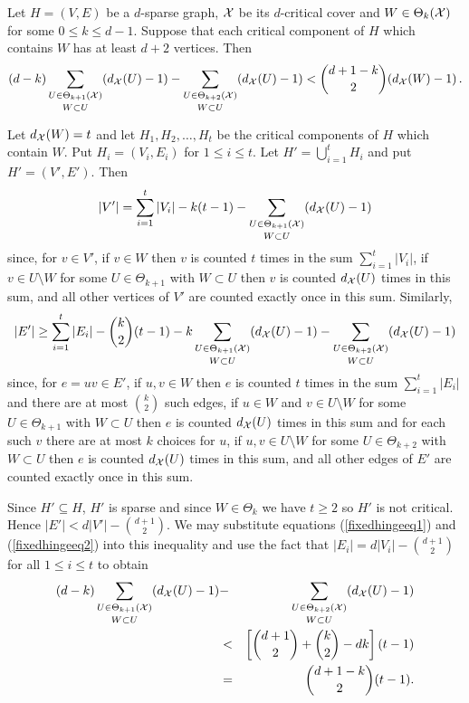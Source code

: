 \documentclass[11pt]{article}
\begin{document}
\begin{lemma}\label{prefixedhinge}
Let $H=(V,E)$ be a $d$-sparse graph, $\cal X$ be its $d$-critical
cover and $W\in \Theta_k({\cal X})$ for some $0\leq k\leq d-1$. Suppose
that each critical component of $H$ which contains $W$ has at least
$d+2$ vertices. Then
$$
(d-k)\sum_{\substack{U\in\Theta_{k+1}({\cal X})\\[0.7mm]W\subset U}}(d_{\cal X}(U)-1)-
\sum_{\substack{U\in\Theta_{k+2}({\cal X})\\[0.7mm]W\subset U}}(d_{\cal X}(U)-1)<{{d+1-k}\choose{2}}(d_{\cal X}(W)-1)
\,.$$
\end{lemma}
\bproof Let $d_{\cal X}(W)=t$ and let $H_1,H_2,\ldots,H_t$ be the
critical components of $H$ which contain $W$. Put $H_i=(V_i,E_i)$
for $1\leq i\leq t$. Let $H'=\bigcup_{i=1}^tH_i$ and put
$H'=(V',E')$. Then
\begin{equation}\label{fixedhingeeq1}
 |V'|=\sum_{i=1}^t|V_i|-k(t-1)-\sum_{\substack{U\in\Theta_{k+1}(\calx)\\[0.7mm]W\subset
 U}}(d_\calx(U)-1)
\end{equation}
since, for $v\in V'$, if $v\in W$ then $v$ is counted $t$ times in
the sum $\sum_{i=1}^t|V_i|$, if $v\in U\setminus W$ for some
$U\in\Theta_{k+1}$ with $W\subset U$ then $v$ is counted
$d_{\cal X}(U)$ times in this sum, and all other vertices of $V'$ are
counted exactly once in this sum. Similarly,
\begin{equation}\label{fixedhingeeq2}
 |E'|\geq\sum_{i=1}^t|E_i|-{{k}\choose{2}}(t-1)-k\sum_{\substack{U\in\Theta_{k+1}(\calx)\\[0.7mm]W\subset
 U}}(d_\calx(U)-1)-\sum_{\substack{U\in\Theta_{k+2}(\calx)\\[0.7mm]W\subset
 U}}(d_\calx(U)-1)
\end{equation}
since, for $e=uv\in E'$, if $u,v\in W$ then $e$ is counted $t$ times
in the sum $\sum_{i=1}^t|E_i|$ and there are at most
${{k}\choose{2}}$ such edges, if $u\in W$ and $v\in U\setminus W$
for some $U\in\Theta_{k+1}$ with $W\subset U$ then $e$ is counted
$d_{\cal X}(U)$ times in this sum and for each such $v$ there are at
most $k$ choices for $u$, if $u,v\in U\setminus W$ for some
$U\in\Theta_{k+2}$ with $W\subset U$ then $e$ is counted
$d_{\cal X}(U)$ times in this sum, and all other edges of $E'$ are
counted exactly once in this sum.

Since $H'\subseteq H$, $H'$ is sparse and since $W\in \Theta_k$ we
have $t\geq 2$ so $H'$ is not critical. Hence $|E'|<
d|V'|-{{d+1}\choose{2}}$. We may substitute equations
(\ref{fixedhingeeq1}) and (\ref{fixedhingeeq2}) into this inequality
and use the fact that $|E_i|=d|V_i|-{{d+1}\choose{2}}$ for all
$1\leq i\leq t$ to obtain
\begin{eqnarray*}
(d-k)\sum_{\substack{U\in\Theta_{k+1}({\cal X})\\[0.7mm]W\subset
U}}(d_{\cal X}(U)-1)&-&
\sum_{\substack{U\in\Theta_{k+2}({\cal X})\\[0.7mm]W\subset
U}}(d_{\cal X}(U)-1)\\
&<&\left[{{d+1}\choose{2}}+{{k}\choose{2}}-dk\right](t-1)\\
&=& {{d+1-k}\choose{2}}(t-1).
\end{eqnarray*}
\eproof
\end{document}
